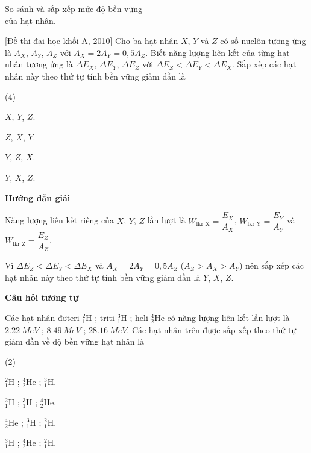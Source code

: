 \begin{dang}{So sánh và sắp xếp mức độ bền vững\\ của hạt nhân.}




{[Đề thi đại học khối A, 2010] Cho ba hạt nhân $X$, $Y$ và $Z$ có số nuclôn tương ứng là $A_X$, $A_Y$, $A_Z$ với $A_X = 2A_Y = 0,5A_Z$. Biết năng lượng liên kết của từng hạt nhân tương ứng là $\Delta E_X$, $\Delta E_Y$, $\Delta E_Z$ với $\Delta E_Z < \Delta E_Y < \Delta E_X$. Sắp xếp các hạt nhân này theo thứ tự tính bền vững giảm dần là
	\begin{mcq}(4)
		\item $X$, $Y$, $Z$.
		\item $Z$, $X$, $Y$. 
		\item $Y$, $Z$, $X$.
		\item $Y$, $X$, $Z$.
	\end{mcq}
}{\begin{center}
	\textbf{Hướng dẫn giải}
\end{center}

	Năng lượng liên kết riêng của $X$, $Y$, $Z$ lần lượt là $W_\textrm{lkr X}=\dfrac{E_X}{A_X}$, $W_\textrm{lkr Y}=\dfrac{E_Y}{A_Y}$ và $W_\textrm{lkr Z}=\dfrac{E_Z}{A_Z}$.
	
	Vì $\Delta E_Z < \Delta E_Y < \Delta E_X$ và $A_X = 2A_Y = 0,5A_Z$ ($A_Z>A_X>A_Y$) nên sắp xếp các hạt nhân này theo thứ tự tính bền vững giảm dần là $Y$, $X$, $Z$.
	
\begin{center}
	\textbf{Câu hỏi tương tự}
\end{center}
Các hạt nhân đơteri $ ^{2}_{1} \text{H} $ ; triti $ ^{3}_{1} \text{H} $ ; heli $ ^{4}_{2} \text{He} $ có năng lượng liên kết lần lượt là $ \SI{2,22}{MeV} $ ; $ \SI{8,49}{MeV} $ ; $ \SI{28,16}{MeV} $. Các hạt nhân trên được sắp xếp theo thứ tự giảm dần về độ bền vững hạt nhân là
\begin{mcq}(2)
	\item $ ^{2}_{1} \text{H} $ ; $ ^{4}_{2} \text{He} $ ; $ ^{3}_{1} \text{H} $.
	\item $ ^{2}_{1} \text{H} $ ; $ ^{3}_{1} \text{H} $ ; $ ^{4}_{2} \text{He} $.
	\item $ ^{4}_{2} \text{He} $ ; $ ^{3}_{1} \text{H} $ ; $ ^{2}_{1} \text{H} $.
	\item $ ^{3}_{1} \text{H} $ ; $ ^{4}_{2} \text{He} $ ; $ ^{2}_{1} \text{H} $.
\end{mcq}

}
\end{dang}
